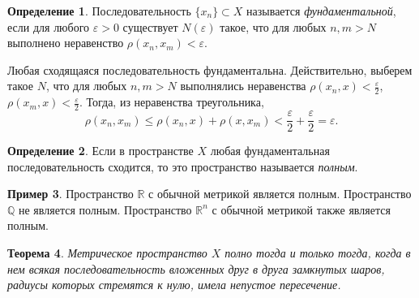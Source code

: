 \documentclass[12pt, titlepage, oneside]{amsbook}
\newcommand{\RR}{\mathbb{R}}
\newcommand{\QQ}{\mathbb{Q}}
\newtheorem{theorem}{Теорема}[chapter]
\theoremstyle{definition}
\newtheorem{example}[theorem]{Пример}
\newtheorem{definition}[theorem]{Определение}
\theoremstyle{remark}
\begin{document}
\begin{definition}
	Последовательность $\{x_n\}\subset X$ называется \emph{фундаментальной}, если для любого $\varepsilon>0$ существует $N(\varepsilon)$ такое, что для любых $n,m>N$ выполнено неравенство $\rho(x_n,x_m)<\varepsilon$.
\end{definition}

Любая сходящаяся последовательность фундаментальна. Действительно, выберем такое $N$, что для любых $n,m>N$ выполнялись неравенства $\rho(x_n,x)<\frac{\varepsilon}{2}$, $\rho(x_m,x)<\frac{\varepsilon}{2}$. Тогда, из неравенства треугольника, $$\rho(x_n,x_m)\leq\rho(x_n,x)+\rho(x,x_m)<\frac{\varepsilon}{2}+\frac{\varepsilon}{2}=\varepsilon.$$

\begin{definition}
	Если в пространстве $X$ любая фундаментальная последовательность сходится, то это пространство называется \emph{полным}.
\end{definition}

\begin{example}
	Пространство $\RR$ с обычной метрикой является полным. Пространство $\QQ$ не является полным. Пространство $\RR^n$ с обычной метрикой также является полным.
\end{example}

\begin{theorem}
	\label{Pol2}
	Метрическое пространство $X$ полно тогда и только тогда, когда в нем всякая последовательность вложенных друг в друга замкнутых шаров, радиусы которых стремятся к нулю, имела непустое пересечение.
\end{theorem}
\end{document}
